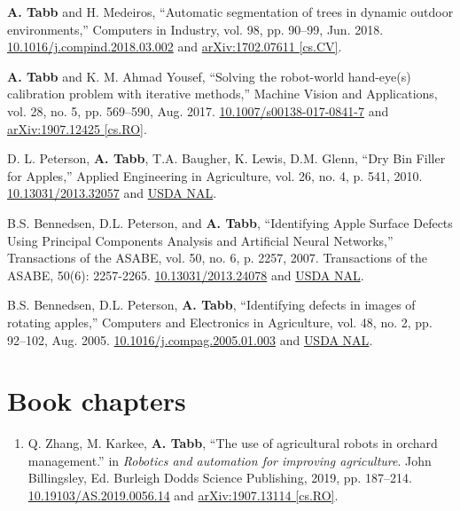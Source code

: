 \documentclass[letterpaper,11pt]{article}
\begin{document}
\begin{enumerate}[noitemsep, leftmargin=*,label={[\arabic*]}]
\item{\textbf{A. Tabb} and H. Medeiros, ``Automatic segmentation of trees in dynamic outdoor environments,” Computers in Industry, vol. 98, pp. 90–99, Jun. 2018. \href{https://doi.org/10.1016/j.compind.2018.03.002}{10.1016/j.compind.2018.03.002} and \href{https://arxiv.org/pdf/1702.07611.pdf}{arXiv:1702.07611 [cs.CV]}.}

\item{\textbf{A. Tabb} and K. M. Ahmad Yousef, “Solving the robot-world hand-eye(s) calibration problem with iterative methods,” Machine Vision and Applications, vol. 28, no. 5, pp. 569–590, Aug. 2017. \href{https://doi.org/10.1007/s00138-017-0841-7}{10.1007/s00138-017-0841-7} and \href{https://arxiv.org/pdf/1907.12425.pdf}{arXiv:1907.12425 [cs.RO]}. }

\item{D. L. Peterson, \textbf{A. Tabb}, T.A. Baugher, K. Lewis, D.M. Glenn, “Dry Bin Filler for Apples,” Applied Engineering in Agriculture, vol. 26, no. 4, p. 541, 2010. \href{https://doi.org/10.13031/2013.32057}{10.13031/2013.32057} and \href{https://naldc.nal.usda.gov/download/46081/PDF}{USDA NAL}.}

\item{B.S. Bennedsen, D.L. Peterson, and \textbf{A. Tabb}, “Identifying Apple Surface Defects Using Principal Components Analysis and Artificial Neural Networks,” Transactions of the ASABE, vol. 50, no. 6, p. 2257, 2007. Transactions of the ASABE, 50(6): 2257-2265. \href{https://doi.org/10.13031/2013.24078}{10.13031/2013.24078} and \href{https://naldc.nal.usda.gov/download/19567/PDF}{USDA NAL}.}

\item{B.S. Bennedsen, D.L. Peterson, \textbf{A. Tabb}, “Identifying defects in images of rotating apples,” Computers and Electronics in Agriculture, vol. 48, no. 2, pp. 92–102, Aug. 2005. \href{https://doi.org/10.1016/j.compag.2005.01.003}{10.1016/j.compag.2005.01.003} and \href{https://naldc.nal.usda.gov/download/6652/PDF}{USDA NAL}.}
\end{enumerate}

\section{Book chapters}
\begin{enumerate}[noitemsep, leftmargin=*,resume*]
\item{Q. Zhang, M. Karkee, \textbf{A. Tabb}, ``The use of agricultural robots in orchard management.” in {\it Robotics and automation for improving agriculture}. John Billingsley, Ed. Burleigh Dodds Science Publishing, 2019, pp. 187–214. \href{https://doi.org/10.19103/AS.2019.0056.14}{10.19103/AS.2019.0056.14} and \href{https://arxiv.org/pdf/1907.13114.pdf}{arXiv:1907.13114 [cs.RO]}. }
\end{enumerate}
\end{document}
